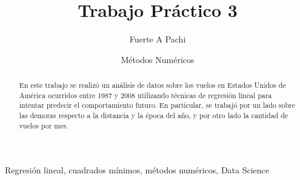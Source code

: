 \documentclass{endm}
\begin{document}
\begin{frontmatter}

\title{Trabajo Práctico 3}

\author{Fuerte A Pachi}
\address{Frachtenberg Goldsmit, Kevin\\ Mena, Manuel\\ Szperling, Sebastián\\ Tarrio, Ignacio}

\author{Métodos Numéricos}
\address{2do Cuatrimestre, 2017\\ Facultdad de Ciencias Exactas y Naturales\\ Universidad de Buenos Aires\\ Buenos Aires, Argentina}

\begin{abstract}
En este trabajo se realizó un análisis de datos sobre los vuelos en Estados Unidos de América ocurridos entre 1987 y 2008 utilizando técnicas de regresión lineal para intentar predecir el comportamiento futuro. En particular, se trabajó por un lado sobre las demoras respecto a la distancia y la época del año, y por otro lado la cantidad de vuelos por mes.
\end{abstract}

\begin{keyword}
Regresión lineal, cuadrados mínimos, métodos numéricos, Data Science
\end{keyword}

\end{frontmatter}

\newpage
\tableofcontents

\newpage


\newpage



\newpage


\end{document}
